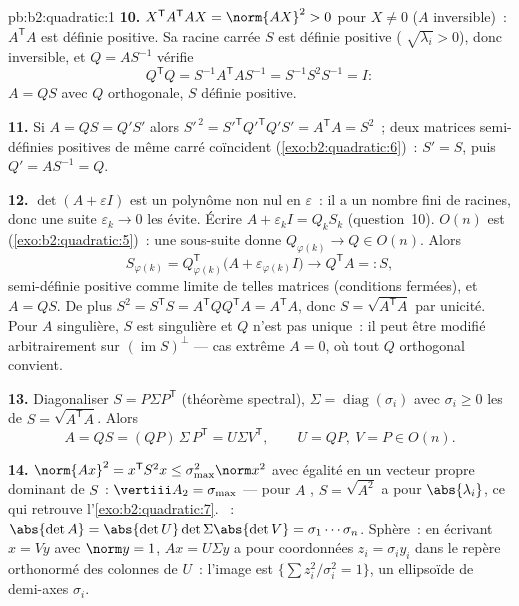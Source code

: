 \begin{solution}{pb:b2:quadratic:1}
\textbf{10.} $X^{\mathsf T}A^{\mathsf T}AX = \norm{AX}^2 > 0$
pour $X \neq 0$ ($A$ inversible)~: $A^{\mathsf T}A$ est définie
positive. Sa racine carrée $S$ est définie positive (
$\sqrt{\lambda_i} > 0$), donc inversible, et $Q = AS^{-1}$
vérifie
\[
Q^{\mathsf T}Q = S^{-1}A^{\mathsf T}AS^{-1}
= S^{-1}S^2S^{-1} = I :
\]
$A = QS$ avec $Q$ orthogonale, $S$ définie positive.

\textbf{11.} Si $A = QS = Q'S'$ alors $S'^{\,2} =
S'^{\mathsf T}Q'^{\mathsf T}Q'S' = A^{\mathsf T}A = S^2$~; deux
matrices semi-définies positives de même carré coïncident
(\cref{exo:b2:quadratic:6})~: $S' = S$, puis $Q' = AS^{-1} =
Q$.

\textbf{12.} $\det(A + \varepsilon I)$ est un polynôme non nul
en $\varepsilon$~: il a un nombre fini de racines, donc une suite
$\varepsilon_k \to 0$ les évite. Écrire $A + \varepsilon_kI =
Q_kS_k$ (question~10). $O(n)$ est 
(\cref{exo:b2:quadratic:5})~: une sous-suite donne $Q_{\varphi(k)}
\to Q \in O(n)$. Alors
\[
S_{\varphi(k)} = Q_{\varphi(k)}^{\mathsf T}
\bigl(A + \varepsilon_{\varphi(k)}I\bigr)
\longrightarrow Q^{\mathsf T}A =: S,
\]
 semi-définie positive comme limite de telles matrices
(conditions fermées), et $A = QS$. De plus $S^2 = S^{\mathsf T}S =
A^{\mathsf T}QQ^{\mathsf T}A = A^{\mathsf T}A$, donc $S =
\sqrt{A^{\mathsf T}A}$ par unicité. Pour $A$ singulière, $S$ est
singulière et $Q$ n'est pas unique~: il peut être modifié
arbitrairement sur $(\operatorname{im} S)^{\perp}$ --- cas extrême
$A = 0$, où tout $Q$ orthogonal convient.

\textbf{13.} Diagonaliser $S = P\Sigma P^{\mathsf T}$ (théorème
spectral), $\Sigma = \operatorname{diag}(\sigma_i)$ avec
$\sigma_i \geq 0$ les  de $S =
\sqrt{A^{\mathsf T}A}$. Alors
\[
A = QS = (QP)\,\Sigma\,P^{\mathsf T} = U\Sigma V^{\mathsf T},
\qquad U = QP,\ V = P \in O(n) .
\]

\textbf{14.} $\norm{Ax}^2 = x^{\mathsf T}S^2x \leq
\sigma_{\max}^2\norm x^2$ avec égalité en un vecteur propre dominant
de $S$~: $\vertiii A_2 = \sigma_{\max}$ --- pour $A$ ,
$S = \sqrt{A^2}$ a pour  $\abs{\lambda_i}$, ce qui
retrouve l'\cref{exo:b2:quadratic:7}. ~: $\abs{\det A} =
\abs{\det U}\det\Sigma\abs{\det V} = \sigma_1\cdots\sigma_n$.
Sphère~: en écrivant $x = Vy$ avec $\norm y = 1$, $Ax = U\Sigma y$
a pour coordonnées $z_i = \sigma_iy_i$ dans le repère orthonormé des
colonnes de $U$~: l'image est $\{\sum z_i^2/\sigma_i^2 =
1\}$, un ellipsoïde de demi-axes $\sigma_i$.


\end{solution}

